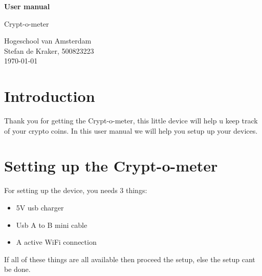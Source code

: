 \documentclass[11pt]{article}
\begin{document}
    \begin{titlepage}
        \begin{center}
            \vspace*{0.3cm}

            \Huge
            \textbf{User manual}

            \vspace{0.5cm}
            \LARGE
            Crypt-o-meter\\

            \vspace{0.8cm}


            \Large
            Hogeschool van Amsterdam\\
            Stefan de Kraker, 500823223\\
            \today

            \vspace{0.8cm}


        \end{center}
    \end{titlepage}
    \newpage
    \begin{versionhistory}
    \end{versionhistory}
    \newpage
    \tableofcontents
    \newpage
    \section{Introduction}\label{sec:introduction}
    Thank you for getting the Crypt-o-meter, this little device will help u keep track of your crypto coins.
    In this user manual we will help you setup up your devices.

    \section{Setting up the Crypt-o-meter}\label{sec:setting-up-the-Crypt-o-meter}
    For setting up the device, you needs 3 things:
    \begin{itemize}
        \item 5V usb charger
        \item Usb A to B mini cable
        \item A active WiFi connection
    \end{itemize}
    If all of these things are all available then proceed the setup, else the setup cant be done.
\end{document}
